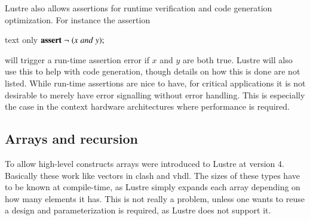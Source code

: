 Lustre also allows assertions for runtime verification and code generation optimization. 
For instance the assertion \\
\begin{changemargin}{1cm}{0cm}
\begin{expansionno}{text only}
\ensuremath{\textbf{assert}\;\neg \;(\Varid{x}\;\Varid{and}\;\Varid{y});}
\end{expansionno}
\end{changemargin}

will trigger a run-time assertion error if $x$ and $y$ are both true. 
Lustre will also use this to help with code generation, though details on how this is done are not listed.
While run-time assertions are nice to have, for critical applications it is not desirable to merely have error signalling without error handling.
This is especially the case in the context hardware architectures where performance is required.

\subsection{Arrays and recursion}
To allow high-level constructs arrays were introduced to Lustre at version 4. 
Basically these work like vectors in \gls{clash} and \gls{vhdl}.
The sizes of these types have to be known at compile-time, as Lustre simply expands each array depending on how many elements it has. 
This is not really a problem, unless one wants to reuse a design and parameterization is required, as Lustre does not support it.

